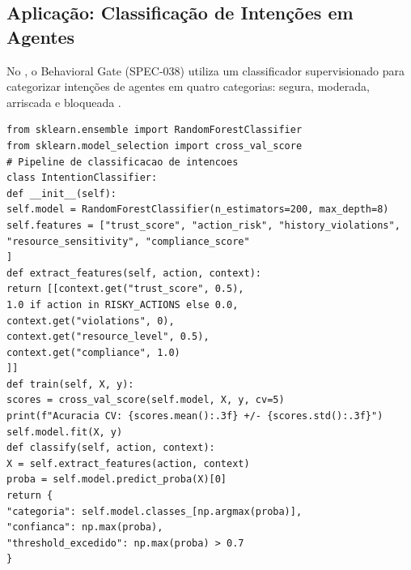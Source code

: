 \subsection{Aplicação: Classificação de Intenções em Agentes}
No \opencodeeco{}, o Behavioral Gate (SPEC-038) utiliza um classificador
supervisionado para categorizar intenções de agentes em quatro categorias:
segura, moderada, arriscada e bloqueada \cite{opencode2026spec038}.
\begin{lstlisting}[style=pythonstyle]
from sklearn.ensemble import RandomForestClassifier
from sklearn.model_selection import cross_val_score
# Pipeline de classificacao de intencoes
class IntentionClassifier:
def __init__(self):
self.model = RandomForestClassifier(n_estimators=200, max_depth=8)
self.features = ["trust_score", "action_risk", "history_violations",
"resource_sensitivity", "compliance_score"
]
def extract_features(self, action, context):
return [[context.get("trust_score", 0.5),
1.0 if action in RISKY_ACTIONS else 0.0,
context.get("violations", 0),
context.get("resource_level", 0.5),
context.get("compliance", 1.0)
]]
def train(self, X, y):
scores = cross_val_score(self.model, X, y, cv=5)
print(f"Acuracia CV: {scores.mean():.3f} +/- {scores.std():.3f}")
self.model.fit(X, y)
def classify(self, action, context):
X = self.extract_features(action, context)
proba = self.model.predict_proba(X)[0]
return {
"categoria": self.model.classes_[np.argmax(proba)],
"confianca": np.max(proba),
"threshold_excedido": np.max(proba) > 0.7
}
\end{lstlisting}
